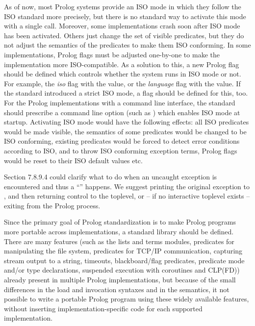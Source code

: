 \documentclass[draft]{llncs}%
\begin{document}
As of now, most Prolog systems provide an ISO mode in which they
follow the ISO standard more precisely, but there is no standard way to
activate this mode with a single call. Moreover, some implementations crash
soon after ISO mode has been activated. Others just change the set of visible
predicates, but they do not adjust the semantics of the predicates to make
them ISO conforming. In some implementations, Prolog flags must be adjusted
one-by-one to make the implementation more ISO-compatible.
As a solution to this, a new Prolog flag should be defined which
controls whether the system runs in ISO mode or not. For example, the
\textsl{iso} flag with the  value, or the \textsl{language} flag
with the  value. If the standard introduced a strict ISO mode, a
flag should be defined for this, too. For the Prolog implementations with a
command line interface, the standard should prescribe a command line option
(such as ) which enables ISO mode at startup. Activating ISO
mode would have the following effects: all ISO predicates would be made
visible, the semantics of some predicates would be changed to be ISO
conforming, existing predicates would be forced to detect error conditions
according to ISO, and to throw ISO conforming exception terms, Prolog
flags would be reset to their ISO default values etc.

Section 7.8.9.4 could clarify what to do when an uncaught exception is
encountered and thus a ``'' happens.
We suggest printing the original exception to
, and then
returning control to the toplevel, or -- if no interactive toplevel exists --
exiting from the Prolog process.

Since the primary goal of Prolog standardization is to make Prolog programs
more portable across implementations, a standard library should be defined.
There are many features (such as the \textsf{lists} and \textsf{terms}
modules, predicates for manipulating the file system, predicates for TCP/IP
communication, capturing stream output to a string, timeouts,
blackboard\slash flag predicates, predicate mode and/or type declarations,
suspended execution with coroutines and CLP(FD))
already present in multiple Prolog implementations, but because of the small
differences in the load and invocation syntaxes and in the semantics, it not
possible to write a portable Prolog program using these widely available
features, without inserting implementation-specific code for each
supported implementation.
\end{document}
